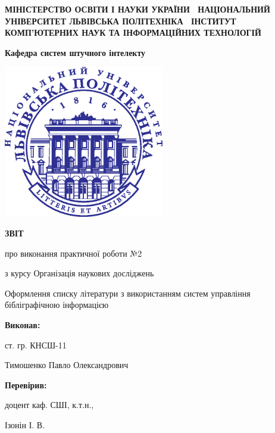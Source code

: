 \documentclass[oneside,14pt,a4paper]{extreport}
\newcommand \labno    {2}
\newcommand \course   {Організація наукових досліджень}
\newcommand \group    {11}
\newcommand \lecturer {Ізонін І. В.}
\newcommand \theme    {Оформлення списку літератури з використанням систем управління бібліграфічною інформацією}
\begin{document}
\begin{titlepage}

\centering
 \textbf{
  МІНІСТЕРСТВО ОСВІТИ І НАУКИ УКРАЇНИ \
  НАЦІОНАЛЬНИЙ УНІВЕРСИТЕТ \flqq{}ЛЬВІВСЬКА ПОЛІТЕХНІКА\frqq{} \
  ІНСТИТУТ КОМП’ЮТЕРНИХ НАУК ТА ІНФОРМАЦІЙНИХ ТЕХНОЛОГІЙ
 }

\vspace{0.5cm}
 \textbf{
  Кафедра систем штучного інтелекту
}

\vspace*{\fill}

  {
    \centering
    \includegraphics[width=7cm]{imgs/logo.eps}
  }

\vspace{1cm}

  {\textbf{ЗВІТ} \par{}
  {про виконання практичної роботи №\labno}
   \par}
  {з курсу \flqq{}\course\frqq{} \par}

\vspace{1cm} \theme

\raggedleft\vfill

 {\textbf{Виконав:} \par}
 {ст. гр. КНСШ-\group \par}
 {Тимошенко Павло Олександрович \par}


 {\textbf{Перевірив:} \par}
 {доцент каф. СШІ, к.т.н.,}
 {\lecturer \par}

\vspace{1cm}


\end{titlepage}
\end{document}
